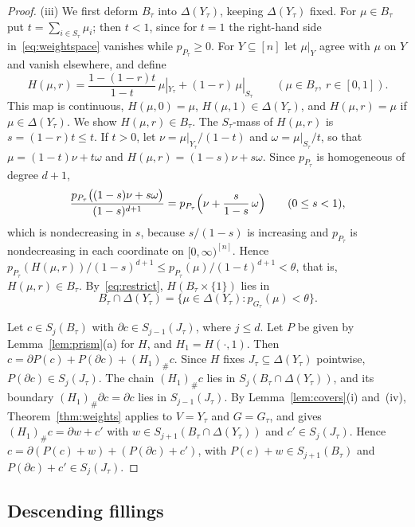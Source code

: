 \documentclass[11pt]{article}
\theoremstyle{definition}
\numberwithin{equation}{section}
\begin{document}
\begin{proof}
(iii) We first deform $B_\tau$ into $\Delta(Y_\tau)$, keeping $\Delta(Y_\tau)$ fixed. For $\mu\in B_\tau$ put $t=\sum_{i\in S_\tau}\mu_i$; then $t<1$, since for $t=1$ the right-hand side in~\eqref{eq:weightspace} vanishes while $p_{P_\tau}\ge0$. For $Y\subseteq[n]$ let $\mu|_Y$ agree with $\mu$ on $Y$ and vanish elsewhere, and define
\begin{equation*}
 H(\mu,r)=\frac{1-(1-r)t}{1-t}\,\mu|_{Y_\tau}+(1-r)\,\mu|_{S_\tau}\qquad(\mu\in B_\tau,\ r\in[0,1]).
\end{equation*}
This map is continuous, $H(\mu,0)=\mu$, $H(\mu,1)\in\Delta(Y_\tau)$, and $H(\mu,r)=\mu$ if $\mu\in\Delta(Y_\tau)$. We show $H(\mu,r)\in B_\tau$. The $S_\tau$-mass of $H(\mu,r)$ is $s=(1-r)t\le t$. If $t>0$, let $\nu=\mu|_{Y_\tau}/(1-t)$ and $\omega=\mu|_{S_\tau}/t$, so that $\mu=(1-t)\nu+t\omega$ and $H(\mu,r)=(1-s)\nu+s\omega$. Since $p_{P_\tau}$ is homogeneous of degree $d+1$,
\begin{equation*}
 \frac{p_{P_\tau}\bigl((1-s)\nu+s\omega\bigr)}{(1-s)^{d+1}}=p_{P_\tau}\Bigl(\nu+\frac s{1-s}\,\omega\Bigr)\qquad(0\le s<1),
\end{equation*}
which is nondecreasing in $s$, because $s/(1-s)$ is increasing and $p_{P_\tau}$ is nondecreasing in each coordinate on $[0,\infty)^{[n]}$. Hence $p_{P_\tau}(H(\mu,r))/(1-s)^{d+1}\le p_{P_\tau}(\mu)/(1-t)^{d+1}<\theta$, that is, $H(\mu,r)\in B_\tau$. By~\eqref{eq:restrict}, $H(B_\tau\times\{1\})$ lies in
\begin{equation*}
 B_\tau\cap\Delta(Y_\tau)=\{\mu\in\Delta(Y_\tau):p_{G_\tau}(\mu)<\theta\}.
\end{equation*}

Let $c\in S_j(B_\tau)$ with $\partial c\in S_{j-1}(J_\tau)$, where $j\le d$. Let $P$ be given by Lemma~\ref{lem:prism}(a) for $H$, and $H_1=H(\cdot,1)$. Then $c=\partial P(c)+P(\partial c)+(H_1)_\#c$. Since $H$ fixes $J_\tau\subseteq\Delta(Y_\tau)$ pointwise, $P(\partial c)\in S_j(J_\tau)$. The chain $(H_1)_\#c$ lies in $S_j(B_\tau\cap\Delta(Y_\tau))$, and its boundary $(H_1)_\#\partial c=\partial c$ lies in $S_{j-1}(J_\tau)$. By Lemma~\ref{lem:covers}(i) and~(iv), Theorem~\ref{thm:weights} applies to $V=Y_\tau$ and $G=G_\tau$, and gives $(H_1)_\#c=\partial w+c'$ with $w\in S_{j+1}(B_\tau\cap\Delta(Y_\tau))$ and $c'\in S_j(J_\tau)$. Hence $c=\partial(P(c)+w)+(P(\partial c)+c')$, with $P(c)+w\in S_{j+1}(B_\tau)$ and $P(\partial c)+c'\in S_j(J_\tau)$.
\end{proof}

\subsection{Descending fillings}
\end{document}
